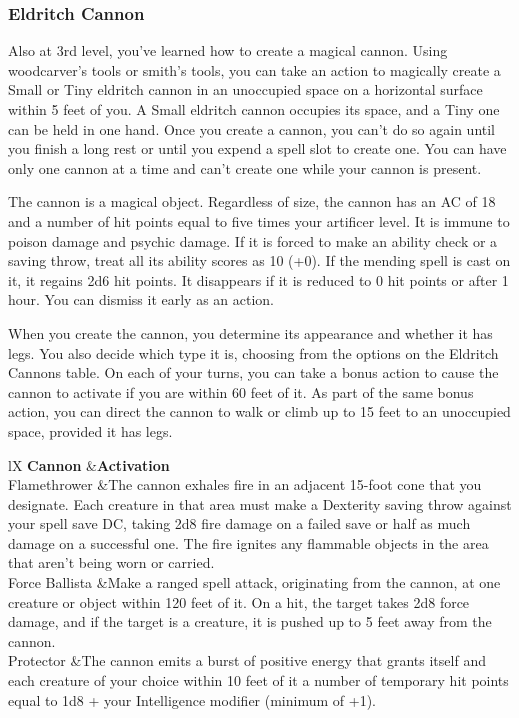 \documentclass[letterpaper,openany,oneside,twocolumn]{book}
\begin{document}
\subsubsection*{Eldritch Cannon}
Also at 3rd level, you've learned how to create a magical cannon. Using woodcarver's tools or smith's tools, you can take an action to magically create a Small or Tiny eldritch cannon in an unoccupied space on a horizontal surface within 5 feet of you. A Small eldritch cannon occupies its space, and a Tiny one can be held in one hand. Once you create a cannon, you can't do so again until you finish a long rest or until you expend a spell slot to create one. You can have only one cannon at a time and can't create one while your cannon is present.

The cannon is a magical object. Regardless of size, the cannon has an AC of 18 and a number of hit points equal to five times your artificer level. It is immune to poison damage and psychic damage. If it is forced to make an ability check or a saving throw, treat all its ability scores as 10 (+0). If the mending spell is cast on it, it regains 2d6 hit points. It disappears if it is reduced to 0 hit points or after 1 hour. You can dismiss it early as an action.

When you create the cannon, you determine its appearance and whether it has legs. You also decide which type it is, choosing from the options on the Eldritch Cannons table. On each of your turns, you can take a bonus action to cause the cannon to activate if you are within 60 feet of it. As part of the same bonus action, you can direct the cannon to walk or climb up to 15 feet to an unoccupied space, provided it has legs.
\begin{DndTable}[header=Eldritch Cannon]{lX}
\textbf{Cannon}  	&\textbf{Activation}				\\
Flamethrower		&The cannon exhales fire in an adjacent 15-foot cone that you designate. Each creature in that area must make a Dexterity saving throw against your spell save DC, taking 2d8 fire damage on a failed save or half as much damage on a successful one. The fire ignites any flammable objects in the area that aren't being worn or carried.\\
Force Ballista		&Make a ranged spell attack, originating from the cannon, at one creature or object within 120 feet of it. On a hit, the target takes 2d8 force damage, and if the target is a creature, it is pushed up to 5 feet away from the cannon.\\
Protector			&The cannon emits a burst of positive energy that grants itself and each creature of your choice within 10 feet of it a number of temporary hit points equal to 1d8 + your Intelligence modifier (minimum of +1).\\
\end{DndTable}
\end{document}
